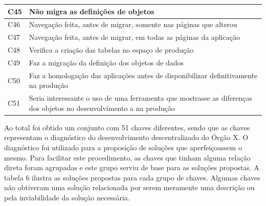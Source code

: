 \begin{longtable}{|M{1.3cm} | m{14.0cm}|}
C45            & Não migra as definições de objetos                                                                                                                                                                                                                                \\ \hline
C46            & Navegação feita, antes de migrar, somente nas páginas que alterou                                                                                                                                                                                                 \\ \hline
C47            & Navegação feita, antes de migrar, em todas as páginas da aplicação                                                                                                                                                                                                \\ \hline
C48            & Verifica a criação das tabelas no espaço de produção                                                                                                                                                                                                              \\ \hline
C49            & Faz a migração da definição dos objetos de dados                                                                                                                                                                                                                  \\ \hline
C50            & Faz a homologação das aplicações antes de disponibilizar definitivamente na produção                                                                                                                                                                              \\ \hline
C51            & Seria interessante o uso de uma ferramenta que mostrasse as diferenças dos objetos no desenvolvimento a na produção                                                                                                                                            \\ \hline
\end{longtable}

Ao total foi obtido um conjunto com 51 chaves diferentes, sendo que as chaves representam o diagnóstico do desenvolvimento descentralizado do Órgão X. O diagnóstico foi utilizado para a proposição de soluções que aperfeiçoassem o mesmo. Para facilitar este procedimento, as chaves que tinham alguma relação direta foram agrupadas e este grupo serviu de base para as soluções propostas. A tabela 6 ilustra as soluções propostas para cada grupo de chaves. Algumas chaves não obtiveram uma solução relacionada por serem meramente uma descrição ou pela inviabilidade da solução necessária. \clearpage

